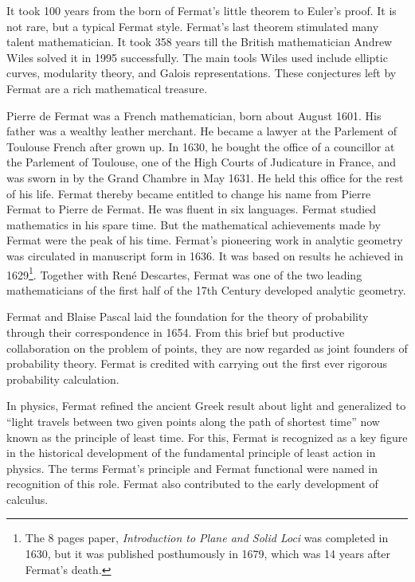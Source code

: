 \documentclass{article}
\begin{document}
It took 100 years from the born of Fermat's little theorem to Euler's proof. It is not rare, but a typical Fermat style. Fermat's last theorem stimulated many talent mathematician. It took 358 years till the British mathematician Andrew Wiles solved it in 1995 successfully. The main tools Wiles used include elliptic curves, modularity theory, and Galois representations\cite{HanXueTao2009}. These conjectures left by Fermat are a rich mathematical treasure.

\vspace{5mm}


Pierre de Fermat was a French mathematician, born about August 1601. His father was a wealthy leather merchant. He became a lawyer at the Parlement of Toulouse French after grown up. In 1630, he bought the office of a councillor at the Parlement of Toulouse, one of the High Courts of Judicature in France, and was sworn in by the Grand Chambre in May 1631. He held this office for the rest of his life. Fermat thereby became entitled to change his name from Pierre Fermat to Pierre de Fermat. He was fluent in six languages. Fermat studied mathematics in his spare time. But the mathematical achievements made by Fermat were the peak of his time. Fermat's pioneering work in analytic geometry was circulated in manuscript form in 1636. It was based on results he achieved in 1629\footnote{The 8 pages paper, {\em Introduction to Plane and Solid Loci} was completed in 1630, but it was published posthumously in 1679, which was 14 years after Fermat's death.}. Together with René Descartes, Fermat was one of the two leading mathematicians of the first half of the 17th Century developed analytic geometry.

Fermat and Blaise Pascal laid the foundation for the theory of probability through their correspondence in 1654. From this brief but productive collaboration on the problem of points, they are now regarded as joint founders of probability theory. Fermat is credited with carrying out the first ever rigorous probability calculation.

In physics, Fermat refined the ancient Greek result about light and generalized to ``light travels between two given points along the path of shortest time'' now known as the principle of least time. For this, Fermat is recognized as a key figure in the historical development of the fundamental principle of least action in physics. The terms Fermat's principle and Fermat functional were named in recognition of this role. Fermat also contributed to the early development of calculus.
\end{document}
